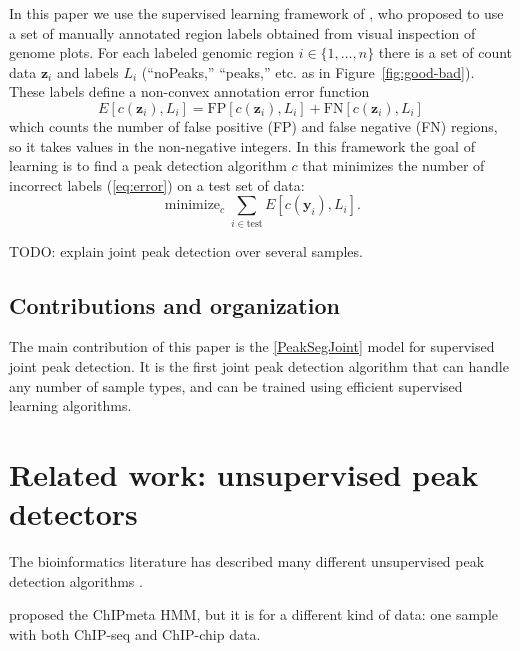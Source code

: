 \documentclass{article} %
\DeclareMathOperator*{\minimize}{minimize}
\begin{document}
In this paper we use the supervised learning framework of
\citet{hocking2014visual}, who proposed to use a set of manually
annotated region labels obtained from visual inspection of genome
plots. For each labeled genomic region $i\in\{1, \dots, n\}$ there is
a set of count data $\mathbf z_i$ and labels $L_i$ (``noPeaks,''
``peaks,'' etc. as in Figure~\ref{fig:good-bad}). These labels define
a non-convex annotation error function
\begin{equation}
  \label{eq:error}
  E[c(\mathbf z_i),  L_i] =
  \text{FP}[c(\mathbf z_i), L_i] +
  \text{FN}[c(\mathbf z_i), L_i]
\end{equation}
which counts the number of false positive (FP) and false negative (FN)
regions, so it takes values in the non-negative integers. In this
framework the goal of learning is to find a peak detection algorithm
$c$ that minimizes the number of incorrect labels (\ref{eq:error}) on
a test set of data:
\begin{equation}
  \label{eq:min_error}
  \minimize_c \sum_{i\in\text{test}} E[c(\mathbf y_i),  L_i].
\end{equation}

TODO: explain joint peak detection over several samples.

\subsection{Contributions and organization}

The main contribution of this paper is the \ref{PeakSegJoint} model
for supervised joint peak detection. It is the first joint peak
detection algorithm that can handle any number of sample types, and
can be trained using efficient supervised
learning algorithms.



\section{Related work: unsupervised peak detectors}
\label{sec:related}

The bioinformatics literature has described many different
unsupervised peak detection algorithms \citep{evaluation2010,
  rye2010manually, chip-seq-bench}.

\citet{hierarchical-joint} proposed the ChIPmeta HMM, but it is for a
different kind of data: one sample with both ChIP-seq and ChIP-chip
data.
\end{document}
